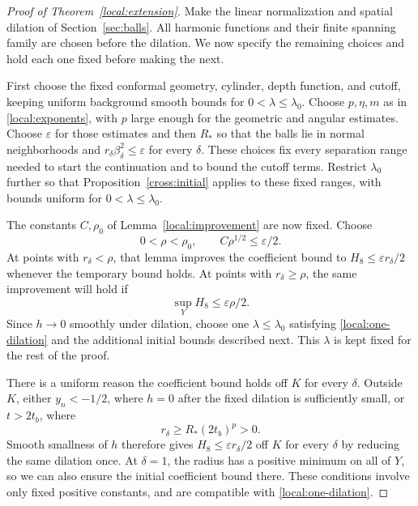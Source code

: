 \documentclass[11pt]{article}
\theoremstyle{definition}
\theoremstyle{remark}
\numberwithin{equation}{section}
\begin{document}
\begin{proof}[Proof of Theorem~\ref{local:extension}]
Make the linear normalization and spatial dilation of
Section~\ref{sec:balls}.  All harmonic functions and their finite
spanning family are chosen before the dilation.  We now specify the
remaining choices and hold each one fixed before making the next.

First choose the fixed conformal geometry, cylinder, depth function,
and cutoff, keeping uniform background smooth bounds for
$0<\lambda\leq\lambda_0$.  Choose $p,\eta,m$ as in
\eqref{local:exponents}, with $p$ large enough for the geometric and
angular estimates.  Choose $\varepsilon$ for those estimates and then
$R_*$ so that the balls lie in normal neighborhoods and
$r_\delta\beta_\delta^2\leq\varepsilon$ for every $\delta$.
These choices fix every separation range needed to start the
continuation and to bound the cutoff terms.  Restrict $\lambda_0$
further so that Proposition~\ref{cross:initial} applies to these fixed
ranges, with bounds uniform for $0<\lambda\leq\lambda_0$.

The constants $C,\rho_0$ of Lemma~\ref{local:improvement} are now
fixed.  Choose
\begin{equation}\label{local:rho-choice}
 0<\rho<\rho_0,\qquad C\rho^{1/2}\leq\varepsilon/2.
\end{equation}
At points with $r_\delta<\rho$, that lemma improves the coefficient
bound to $H_8\leq\varepsilon r_\delta/2$ whenever the temporary bound
holds.  At points with $r_\delta\geq\rho$, the same improvement will
hold if
\begin{equation}\label{local:one-dilation}
 \sup_Y H_8\leq\varepsilon\rho/2.
\end{equation}
Since $h\to0$ smoothly under dilation, choose one
$\lambda\leq\lambda_0$ satisfying \eqref{local:one-dilation} and the
additional initial bounds described next.  This $\lambda$ is kept
fixed for the rest of the proof.

There is a uniform reason the coefficient bound holds off $K$ for
every $\delta$.  Outside $K$, either $y_n<-1/2$, where $h=0$ after
the fixed dilation is sufficiently small, or $t>2t_b$, where
\[
 r_\delta\geq R_*(2t_b)^p>0.
\]
Smooth smallness of $h$ therefore gives
$H_8\leq\varepsilon r_\delta/2$ off $K$ for every $\delta$ by
reducing the same dilation once.  At $\delta=1$, the radius has a
positive minimum on all of $Y$, so we can also ensure the initial
coefficient bound there.  These conditions involve only fixed
positive constants, and are compatible with
\eqref{local:one-dilation}.


\end{proof}
\end{document}
